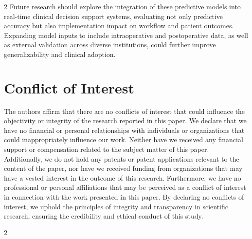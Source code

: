\documentclass[bst/sn-nature]{sn-jnl}
\begin{document}
\begin{multicols}{2}
Future research should explore the integration of these predictive models into real-time clinical decision support systems, evaluating not only predictive accuracy but also implementation impact on workflow and patient outcomes. Expanding model inputs to include intraoperative and postoperative data, as well as external validation across diverse institutions, could further improve generalizability and clinical adoption.

\section{Conflict of Interest}

\quad The authors affirm that there are no conflicts of interest that could influence the objectivity or integrity of the research reported in this paper. We declare that we have no financial or personal relationships with individuals or organizations that could inappropriately influence our work. Neither have we received any financial support or compensation related to the subject matter of this paper. Additionally, we do not hold any patents or patent applications relevant to the content of the paper, nor have we received funding from organizations that may have a vested interest in the outcome of this research. Furthermore, we have no professional or personal affiliations that may be perceived as a conflict of interest in connection with the work presented in this paper. By declaring no conflicts of interest, we uphold the principles of integrity and transparency in scientific research, ensuring the credibility and ethical conduct of this study.

\end{multicols}

\begin{multicols}{2}




\end{multicols}
\end{document}
